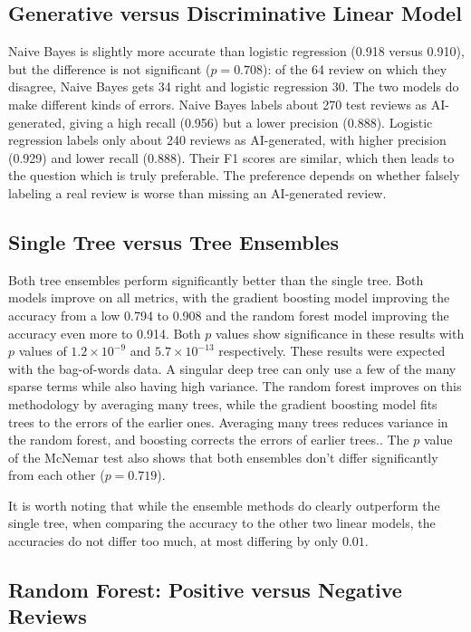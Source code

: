 \documentclass{article}
\begin{document}
\subsection{Generative versus Discriminative Linear Model}

Naive Bayes is slightly more accurate than logistic regression (0.918 versus 0.910), but the difference is not significant ($p = 0.708$): of the 64 review on which they disagree, Naive Bayes gets 34 right and logistic regression 30. The two models do make different kinds of errors. Naive Bayes labels about 270 test reviews as AI-generated, giving a high recall (0.956) but a lower precision (0.888). Logistic regression labels only about 240 reviews as AI-generated, with higher precision (0.929) and lower recall (0.888). Their F1 scores are similar, which then leads to the question which is truly preferable. The preference depends on whether falsely labeling a real review is worse than missing an AI-generated review.

\subsection{Single Tree versus Tree Ensembles}

Both tree ensembles perform significantly better than the single tree. Both models improve on all metrics, with the gradient boosting model improving the accuracy from a low 0.794 to 0.908 and the random forest model improving the accuracy even more to 0.914. Both $p$ values show significance in these results with $p$ values of $1.2 \times 10^{-9}$ and $5.7 \times 10^{-13}$ respectively. These results were expected with the bag-of-words data. A singular deep tree can only use a few of the many sparse terms while also having high variance. The random forest improves on this methodology by averaging many trees, while the gradient boosting model fits trees to the errors of the earlier ones. Averaging many trees reduces variance in the random forest, and boosting corrects the errors of earlier trees.. The $p$ value of the McNemar test also shows that both ensembles don't differ significantly from each other ($p=0.719$).

It is worth noting that while the ensemble methods do clearly outperform the single tree, when comparing the accuracy to the other two linear models, the accuracies do not differ too much, at most differing by only $0.01$. 

\subsection{Random Forest: Positive versus Negative Reviews}
\end{document}
